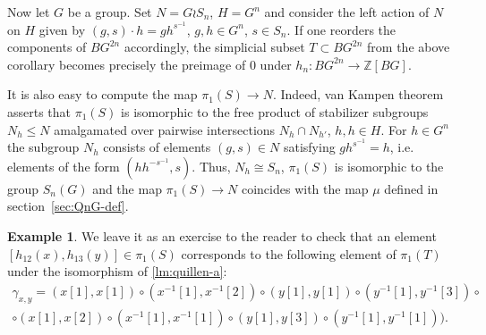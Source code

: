 \documentclass[oneside, 12pt]{amsart}
\theoremstyle{plain}
\numberwithin{equation}{section}
\numberwithin{lemma}{section}
\theoremstyle{remark}
\theoremstyle{definition}
\newtheorem{example}[lemma]{Example} \Crefname{example}{Example}{Examples}
\newcommand{\ZZ}{\mathbb{Z}}
\begin{document}
Now let $G$ be a group. Set $N = G \wr S_n$, $H = G^n$ and consider the left action of $N$ on $H$ given by $(g, s) \cdot h = gh^{s^{-1}}$, $g, h\in G^n$, $s\in S_n$.
If one reorders the components of $BG^{2n}$ accordingly, the simplicial subset $T \subset BG^{2n}$ from the above corollary
 becomes precisely the preimage of $0$ under $h_n \colon BG^{2n} \to \ZZ[BG]$.

It is also easy to compute the map $\pi_1(S) \to N$. Indeed, van Kampen theorem~\cite[Theorem~2.7]{May99} asserts that
$\pi_1(S)$ is isomorphic to the free product of stabilizer subgroups $N_{h} \leq N$ amalgamated over pairwise intersections $N_h \cap N_{h'}$, $h, h\in H$.
For $h \in G^n$ the subgroup $N_h$ consists of elements $(g, s) \in N$ satisfying $gh^{s^{-1}} = h$, i.e. elements of the form $(hh^{-s^{-1}}, s)$.
Thus, $N_h\cong S_n$, $\pi_1(S)$ is isomorphic to the group $S_n(G)$ and the map $\pi_1(S) \to N$ coincides with the map $\mu$ defined in section~\ref{sec:QnG-def}.

\begin{example} \label{ex44}
 We leave it as an exercise to the reader to check that an element $[h_{12}(x), h_{13}(y)] \in \pi_1(S)$ corresponds to the following element of $\pi_1(T)$
  under the isomorphism of \cref{lm:quillen-a}:
 \begin{multline} \label{eq:pathT}
  \gamma_{x,y} = (x[1], x[1]) \circ (x^{-1}[1], x^{-1}[2]) \circ (y[1], y[1]) \circ (y^{-1}[1], y^{-1}[3]) \circ \\ \circ (x[1], x[2]) \circ (x^{-1}[1], x^{-1}[1]) \circ (y[1], y[3]) \circ (y^{-1}[1], y^{-1}[1])).
 \end{multline}  
\end{example}
\end{document}
